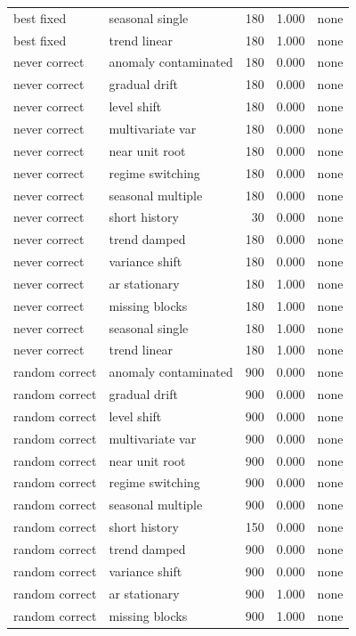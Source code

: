 \begin{tabular}{llrrl}
best fixed & seasonal single & 180 & 1.000 & none \\
best fixed & trend linear & 180 & 1.000 & none \\
never correct & anomaly contaminated & 180 & 0.000 & none \\
never correct & gradual drift & 180 & 0.000 & none \\
never correct & level shift & 180 & 0.000 & none \\
never correct & multivariate var & 180 & 0.000 & none \\
never correct & near unit root & 180 & 0.000 & none \\
never correct & regime switching & 180 & 0.000 & none \\
never correct & seasonal multiple & 180 & 0.000 & none \\
never correct & short history & 30 & 0.000 & none \\
never correct & trend damped & 180 & 0.000 & none \\
never correct & variance shift & 180 & 0.000 & none \\
never correct & ar stationary & 180 & 1.000 & none \\
never correct & missing blocks & 180 & 1.000 & none \\
never correct & seasonal single & 180 & 1.000 & none \\
never correct & trend linear & 180 & 1.000 & none \\
random correct & anomaly contaminated & 900 & 0.000 & none \\
random correct & gradual drift & 900 & 0.000 & none \\
random correct & level shift & 900 & 0.000 & none \\
random correct & multivariate var & 900 & 0.000 & none \\
random correct & near unit root & 900 & 0.000 & none \\
random correct & regime switching & 900 & 0.000 & none \\
random correct & seasonal multiple & 900 & 0.000 & none \\
random correct & short history & 150 & 0.000 & none \\
random correct & trend damped & 900 & 0.000 & none \\
random correct & variance shift & 900 & 0.000 & none \\
random correct & ar stationary & 900 & 1.000 & none \\
random correct & missing blocks & 900 & 1.000 & none \\

\end{tabular}
